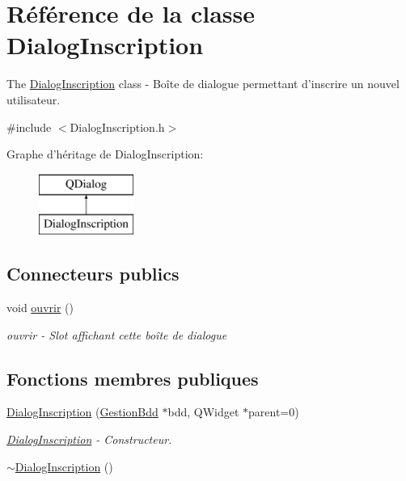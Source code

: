 \hypertarget{class_dialog_inscription}{\section{Référence de la classe Dialog\-Inscription}
\label{class_dialog_inscription}
}


The \hyperlink{class_dialog_inscription}{Dialog\-Inscription} class -\/ Boîte de dialogue permettant d'inscrire un nouvel utilisateur.  




{\ttfamily \#include $<$Dialog\-Inscription.\-h$>$}

Graphe d'héritage de Dialog\-Inscription\-:\begin{figure}[H]
\begin{center}
\leavevmode
\includegraphics[height=2.000000cm]{class_dialog_inscription}
\end{center}
\end{figure}
\subsection*{Connecteurs publics}
\begin{DoxyCompactItemize}
\item 
void \hyperlink{class_dialog_inscription_ac5daf1277af0ca1e3651f57348ac9169}{ouvrir} ()
\begin{DoxyCompactList}\small\item\em ouvrir -\/ Slot affichant cette boîte de dialogue \end{DoxyCompactList}\end{DoxyCompactItemize}
\subsection*{Fonctions membres publiques}
\begin{DoxyCompactItemize}
\item 
\hyperlink{class_dialog_inscription_ac5cbb6acd3d4f6f9a196a09e99aeb0af}{Dialog\-Inscription} (\hyperlink{class_gestion_bdd}{Gestion\-Bdd} $\ast$bdd, Q\-Widget $\ast$parent=0)
\begin{DoxyCompactList}\small\item\em \hyperlink{class_dialog_inscription}{Dialog\-Inscription} -\/ Constructeur. \end{DoxyCompactList}\item 
\hyperlink{class_dialog_inscription_af6c01135d53fd930ed4f59059fa54563}{$\sim$\-Dialog\-Inscription} ()
\end{DoxyCompactItemize}


